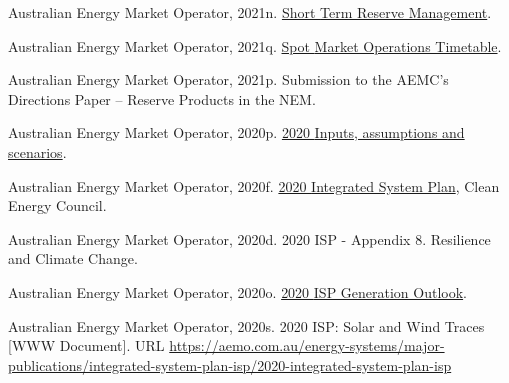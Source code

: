 \documentclass[12pt,a4paper,]{report}
\newlength{\cslhangindent}
\newenvironment{CSLReferences}[2] %
 {%
  \setlength{\parindent}{0pt}
  \ifodd #1 \everypar{\setlength{\hangindent}{\cslhangindent}}\ignorespaces\fi
  \ifnum #2 > 0
  \setlength{\parskip}{#2\baselineskip}
  \fi
 }%
 {}
\begin{document}
\begin{CSLReferences}{1}{0}
\leavevmode{}%
Australian Energy Market Operator, 2021n.
\href{https://aemo.com.au/-/media/files/electricity/nem/security_and_reliability/power_system_ops/procedures/so_op_3703-short-term-reserve-management.pdf?la=en}{Short
{Term Reserve Management}}.

\leavevmode{}%
Australian Energy Market Operator, 2021q.
\href{https://www.aemo.com.au/-/media/Files/Electricity/NEM/Security_and_Reliability/Dispatch/Spot-Market-Operations-Timetable.pdf}{Spot
{Market Operations Timetable}}.

\leavevmode{}%
Australian Energy Market Operator, 2021p. Submission to the {AEMC}'s
{Directions Paper} -- {Reserve Products} in the {NEM}.

\leavevmode{}%
Australian Energy Market Operator, 2020p.
\href{https://aemo.com.au/-/media/files/electricity/nem/planning_and_forecasting/inputs-assumptions-methodologies/2020/2020-inputs-and-assumptions-workbook-dec20.xlsx?la=en}{2020
{Inputs}, assumptions and scenarios}.

\leavevmode{}%
Australian Energy Market Operator, 2020f.
\href{https://aemo.com.au/energy-systems/major-publications/integrated-system-plan-isp/2020-integrated-system-plan-isp}{2020
{Integrated System Plan}}, Clean Energy Council.

\leavevmode{}%
Australian Energy Market Operator, 2020d. 2020 {ISP} - {Appendix} 8.
{Resilience} and {Climate Change}.

\leavevmode{}%
Australian Energy Market Operator, 2020o.
\href{https://aemo.com.au/-/media/files/major-publications/isp/2020/final-2020-isp-generation-outlook.zip?la=en}{2020
{ISP Generation Outlook}}.

\leavevmode{}%
Australian Energy Market Operator, 2020s. 2020 {ISP}: {Solar} and {Wind
Traces} {[}WWW Document{]}. URL
\url{https://aemo.com.au/energy-systems/major-publications/integrated-system-plan-isp/2020-integrated-system-plan-isp}


\end{CSLReferences}
\end{document}

